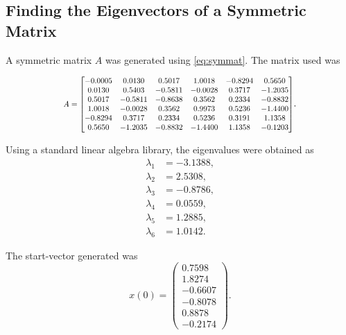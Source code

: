 \documentclass[multicolumn, 9pt]{extarticle}
\begin{document}
\subsection{Finding the Eigenvectors of a Symmetric Matrix}
A symmetric matrix $A$ was generated using \eqref{eq:symmat}. The matrix used was


\newcommand\scalemath[2]{\scalebox{#1}{\mbox{\ensuremath{\displaystyle #2}}}}

\begin{equation*}
	\scalemath{0.8}{
		A = \begin{bmatrix}
			-0.0005 & 0.0130  & 0.5017  & 1.0018  & -0.8294 & 0.5650  \\
			0.0130  & 0.5403  & -0.5811 & -0.0028 & 0.3717  & -1.2035 \\
			0.5017  & -0.5811 & -0.8638 & 0.3562  & 0.2334  & -0.8832 \\
			1.0018  & -0.0028 & 0.3562  & 0.9973  & 0.5236  & -1.4400 \\
			-0.8294 & 0.3717  & 0.2334  & 0.5236  & 0.3191  & 1.1358  \\
			0.5650  & -1.2035 & -0.8832 & -1.4400 & 1.1358  & -0.1203 \\
		\end{bmatrix}}.
\end{equation*}

Using a standard linear algebra library, the eigenvalues were obtained as
\begin{align*}
	\lambda_1 & = -3.1388, \\
	\lambda_2 & = 2.5308,  \\
	\lambda_3 & = -0.8786, \\
	\lambda_4 & = 0.0559,  \\
	\lambda_5 & = 1.2885,  \\
	\lambda_6 & = 1.0142.
\end{align*}

The start-vector generated was
\begin{equation*}
	x(0) = \begin{pmatrix}
		0.7598  \\
		1.8274  \\
		-0.6607 \\
		-0.8078 \\
		0.8878  \\
		-0.2174
	\end{pmatrix}.
\end{equation*}
\end{document}
